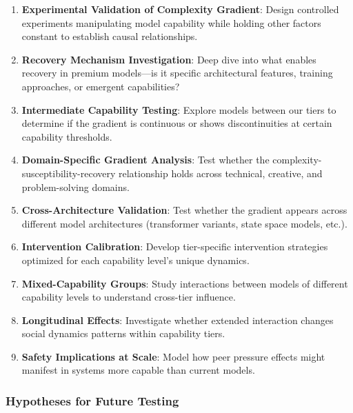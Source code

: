 \documentclass[11pt,letterpaper]{article}
\begin{document}
\begin{enumerate}
    \item \textbf{Experimental Validation of Complexity Gradient}: Design controlled experiments manipulating model capability while holding other factors constant to establish causal relationships.
    
    \item \textbf{Recovery Mechanism Investigation}: Deep dive into what enables recovery in premium models—is it specific architectural features, training approaches, or emergent capabilities?
    
    \item \textbf{Intermediate Capability Testing}: Explore models between our tiers to determine if the gradient is continuous or shows discontinuities at certain capability thresholds.
    
    \item \textbf{Domain-Specific Gradient Analysis}: Test whether the complexity-susceptibility-recovery relationship holds across technical, creative, and problem-solving domains.
    
    \item \textbf{Cross-Architecture Validation}: Test whether the gradient appears across different model architectures (transformer variants, state space models, etc.).
    
    \item \textbf{Intervention Calibration}: Develop tier-specific intervention strategies optimized for each capability level's unique dynamics.
    
    \item \textbf{Mixed-Capability Groups}: Study interactions between models of different capability levels to understand cross-tier influence.
    
    \item \textbf{Longitudinal Effects}: Investigate whether extended interaction changes social dynamics patterns within capability tiers.
    
    \item \textbf{Safety Implications at Scale}: Model how peer pressure effects might manifest in systems more capable than current models.
\end{enumerate}

\subsubsection{Hypotheses for Future Testing}
\end{document}
